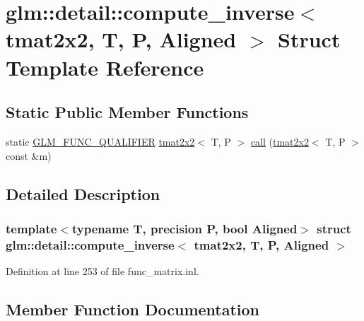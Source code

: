 \hypertarget{structglm_1_1detail_1_1compute__inverse_3_01tmat2x2_00_01_t_00_01_p_00_01_aligned_01_4}{}\section{glm\+::detail\+::compute\+\_\+inverse$<$ tmat2x2, T, P, Aligned $>$ Struct Template Reference}
\label{structglm_1_1detail_1_1compute__inverse_3_01tmat2x2_00_01_t_00_01_p_00_01_aligned_01_4}
\subsection*{Static Public Member Functions}
\begin{DoxyCompactItemize}
\item 
static \mbox{\hyperlink{setup_8hpp_a33fdea6f91c5f834105f7415e2a64407}{G\+L\+M\+\_\+\+F\+U\+N\+C\+\_\+\+Q\+U\+A\+L\+I\+F\+I\+ER}} \mbox{\hyperlink{structglm_1_1tmat2x2}{tmat2x2}}$<$ T, P $>$ \mbox{\hyperlink{structglm_1_1detail_1_1compute__inverse_3_01tmat2x2_00_01_t_00_01_p_00_01_aligned_01_4_a936dd8efa75bed24911e846504e3dbef}{call}} (\mbox{\hyperlink{structglm_1_1tmat2x2}{tmat2x2}}$<$ T, P $>$ const \&m)
\end{DoxyCompactItemize}


\subsection{Detailed Description}
\subsubsection*{template$<$typename T, precision P, bool Aligned$>$\newline
struct glm\+::detail\+::compute\+\_\+inverse$<$ tmat2x2, T, P, Aligned $>$}



Definition at line 253 of file func\+\_\+matrix.\+inl.



\subsection{Member Function Documentation}
\mbox{\label{structglm_1_1detail_1_1compute__inverse_3_01tmat2x2_00_01_t_00_01_p_00_01_aligned_01_4_a936dd8efa75bed24911e846504e3dbef}} 
